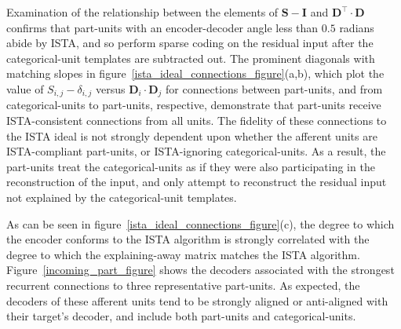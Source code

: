 \documentclass{article} %
\newcommand{\D}{\mathbf{D}}
\newcommand{\E}{\mathbf{E}}
\newcommand{\I}{\mathbf{I}}
\newcommand{\Sm}{\mathbf{S}}
\begin{document}
Examination of the relationship between the elements of $\Sm - \I$ and $\D^{\top} \cdot \D$ confirms that part-units with an encoder-decoder angle less than $0.5$ radians abide by ISTA, and so perform sparse coding on the residual input after the categorical-unit templates are subtracted out.  
The prominent diagonals with matching slopes in figure~\ref{ista_ideal_connections_figure}(a,b), which plot the value of $S_{i,j} - \delta_{i,j}$ versus $\D_i \cdot \D_j$ for connections between part-units, and from categorical-units to part-units, respective, demonstrate that part-units receive ISTA-consistent connections from all units.  The fidelity of these connections to the ISTA ideal is not strongly dependent upon whether the afferent units are ISTA-compliant part-units, or ISTA-ignoring categorical-units.  As a result, the part-units treat the categorical-units as if they were also participating in the reconstruction of the input, and only attempt to reconstruct the residual input not explained by the categorical-unit templates.  

As can be seen in figure~\ref{ista_ideal_connections_figure}(c), the degree to which the encoder conforms to the ISTA algorithm is strongly correlated with the degree to which the explaining-away matrix matches the ISTA algorithm.  Figure~\ref{incoming_part_figure} shows the decoders associated with the strongest recurrent connections to three representative part-units.  As expected, the decoders of these afferent units tend to be strongly aligned or anti-aligned with their target's decoder, and include both part-units and categorical-units.


\begin{comment}
\begin{itemize}
\item For part units (defined by classification matrix column norm), show connected decoders sorted by explaining-away connection magnitude
\item Show connection weight versus ISTA ideal
\end{itemize}
\end{comment}
\end{document}
